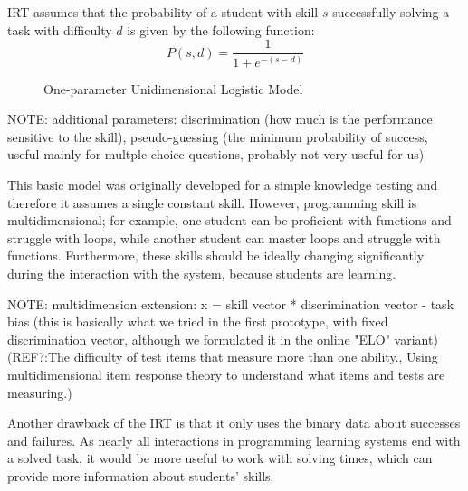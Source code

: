 IRT assumes that the probability of a student with skill $s$
  successfully solving a task with difficulty $d$
  is given by the following function:
  \begin{equation}\label{eq:logistic}
  P(s, d) = \frac{1}{1 + e^{-(s - d)}}
  \end{equation}

\begin{figure}[h]
  \centering
  \caption{One-parameter Unidimensional Logistic Model}
  \label{fig:logistic-model}
\end{figure}

NOTE: additional parameters: discrimination (how much is the performance sensitive to the skill), pseudo-guessing (the minimum probability of success, useful mainly for multple-choice questions, probably not very useful for us)

This basic model was originally developed for a simple knowledge testing
  and therefore it assumes a single constant skill.
However, programming skill is multidimensional;
  for example, one student can be proficient with functions and struggle with loops,
  while another student can master loops and struggle with functions.
Furthermore, these skills should be ideally changing significantly during
  the interaction with the system, because students are learning.

NOTE: multidimension extension: x = skill vector * discrimination vector - task bias
(this is basically what we tried in the first prototype, with fixed discrimination vector,
although we formulated it in the online "ELO" variant)
(REF?:The difficulty of test items that measure more than one ability.,
Using multidimensional item response theory to understand what items and tests are measuring.)

Another drawback of the IRT is that it only uses
  the binary data about successes and failures.
As nearly all interactions in programming learning systems end with a solved task,
  it would be more useful to work with solving times,
  which can provide more information about students' skills.

